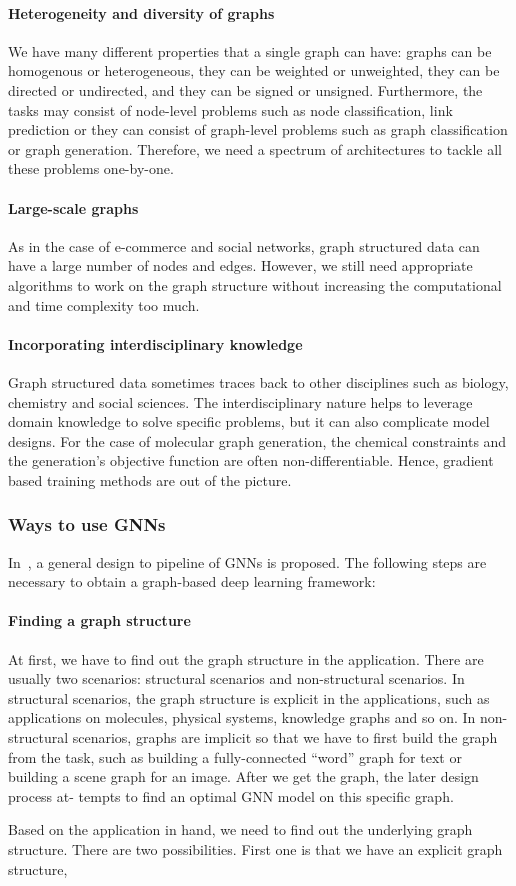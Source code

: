 \paragraph{Heterogeneity and diversity of graphs}
We have many different properties that a single graph can have: graphs can be homogenous or heterogeneous, they can be weighted or unweighted, they can be directed or undirected, and they can be signed or unsigned. Furthermore, the tasks may consist of node-level problems such as node classification, link prediction or they can consist of graph-level problems such as graph classification or graph generation. Therefore, we need a spectrum of architectures to tackle all these problems one-by-one.

\paragraph{Large-scale graphs}
As in the case of e-commerce and social networks, graph structured data can have a large number of nodes and edges. However, we still need appropriate algorithms to work on the graph structure without increasing the computational and time complexity too much.

\paragraph{Incorporating interdisciplinary knowledge}
Graph structured data sometimes traces back to other disciplines such as biology, chemistry and social sciences. The interdisciplinary nature helps to leverage domain knowledge to solve specific problems, but it can also complicate model designs. For the case of molecular graph generation, the chemical constraints and the generation's objective function are often non-differentiable. Hence, gradient based training methods are out of the picture.

\subsubsection{Ways to use GNNs}
In~\autocite{zhou20gnn}, a general design to pipeline of GNNs is proposed. The following steps are necessary to obtain a graph-based deep learning framework:
\paragraph{Finding a graph structure}
At first, we have to find out the graph structure in the application.
There are usually two scenarios: structural scenarios and non-structural
scenarios. In structural scenarios, the graph structure is explicit in the
applications, such as applications on molecules, physical systems,
knowledge graphs and so on. In non-structural scenarios, graphs are
implicit so that we have to first build the graph from the task, such as
building a fully-connected ``word'' graph for text or building a scene
graph for an image. After we get the graph, the later design process at-
tempts to find an optimal GNN model on this specific graph.

Based on the application in hand, we need to find out the underlying graph structure. There are two possibilities. First one is that we have an explicit graph structure,
